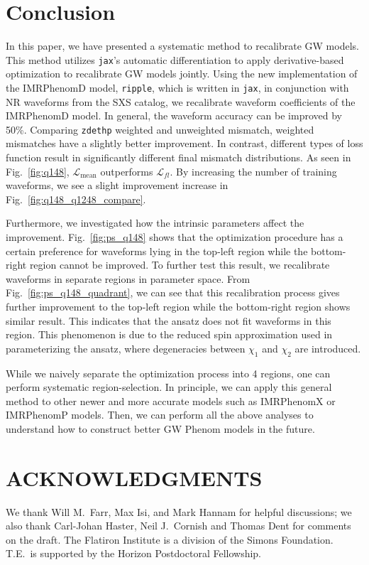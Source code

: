\documentclass[twocolumn]{aastex631}
\newcommand{\ripple}{\texttt{ripple}}
\newcommand{\jax}{\texttt{jax}}
\newcommand{\zdethp}{\texttt{zdethp}}
\begin{document}
\section{Conclusion} \label{sec:conclusion}

In this paper, we have presented a systematic method to recalibrate GW models.
This method utilizes {\jax}'s automatic differentiation to apply
derivative-based optimization to recalibrate GW models jointly. Using the new
implementation of the IMRPhenomD model, {\ripple}, which is written in \jax, in
conjunction with NR waveforms from the SXS catalog, we recalibrate waveform
coefficients of the IMRPhenomD model. In general, the waveform accuracy can be
improved by 50\%. Comparing {\zdethp} weighted and unweighted mismatch, weighted
mismatches have a slightly better improvement. In contrast, different types of
loss function result in significantly different final mismatch distributions. As 
seen in Fig.~\ref{fig:q148}, $\mathcal{L}_{\mathrm{mean}}$ outperforms 
$\mathcal{L}_{fl}$. By increasing the number of training waveforms, we see a 
slight improvement increase in Fig.~\ref{fig:q148_q1248_compare}. 

Furthermore, we investigated how the intrinsic parameters affect the
improvement. Fig.~\ref{fig:ps_q148} shows that the optimization procedure has a
certain preference for waveforms lying in the top-left region while the bottom-right 
region cannot be improved. To further test this result, we recalibrate
waveforms in separate regions in parameter space. From Fig.~\ref{fig:ps_q148_quadrant}, 
we can see that this recalibration process gives further
improvement to the top-left region while the bottom-right region shows similar
result. This indicates that the ansatz does not fit waveforms in this region. 
This phenomenon is due to the reduced spin approximation used in parameterizing the 
ansatz, where degeneracies between $\chi_1$ and $\chi_2$ are introduced. 

While we naively separate the optimization process into 4 regions, one can
perform systematic region-selection. In principle, we can apply this general
method to other newer and more accurate models such as IMRPhenomX or IMRPhenomP
models. Then, we can perform all the above analyses to understand how to
construct better GW Phenom models in the future.  



\section{ACKNOWLEDGMENTS}

We thank Will M.~Farr, Max Isi, and Mark Hannam for helpful discussions; we also
thank Carl-Johan Haster, Neil J.~Cornish and Thomas Dent for comments on the
draft. The Flatiron Institute is a division of the Simons Foundation. T.E.\ is
supported by the Horizon Postdoctoral Fellowship.

\end{document}
